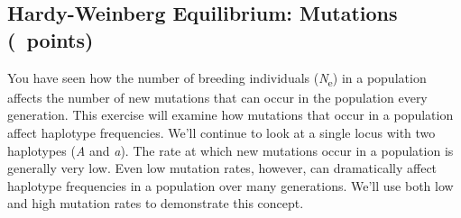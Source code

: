 \documentclass[11pt, addpoints]{exam}
\begin{document}
\subsection*{Hardy-Weinberg Equilibrium: Mutations (\numpoints\ points)}

You have seen how the number of breeding individuals
(\emph{N}\textsubscript{e}) in a population affects the number of new mutations that can occur in the population every generation. This exercise will examine how mutations
that occur in a population affect haplotype frequencies. We'll continue to look 
at a single locus with two haplotypes (\emph{A} and \emph{a}). 
The rate at which new mutations occur in a population is generally very
low. Even low mutation rates, however, can dramatically affect haplotype
frequencies in a population over many generations. We'll use both low
and high mutation rates to demonstrate this concept.
\end{document}

